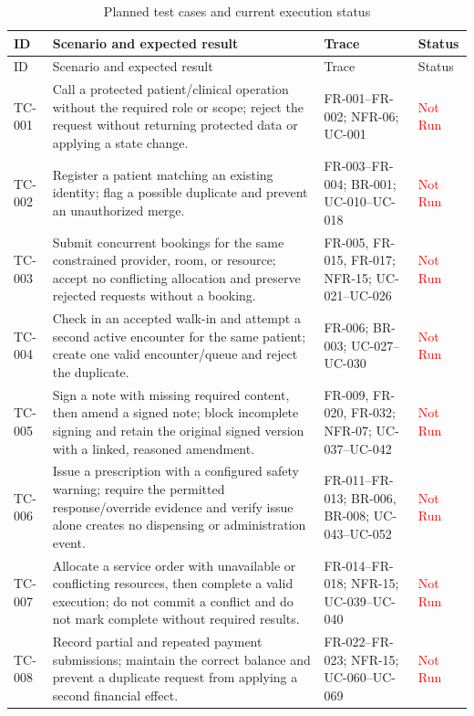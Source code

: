\documentclass[a4paper,12pt]{article}
\newcommand{\weak}[1]{\textcolor{red}{#1}}
\begin{document}
\begingroup
\scriptsize
\renewcommand{\arraystretch}{1.10}
\begin{longtable}{@{}p{}p{}p{}p{}@{}}
\caption{Planned test cases and current execution status}\label{tab:planned-test-cases}\\
\toprule ID & Scenario and expected result & Trace & Status \\
\midrule
\endfirsthead
\toprule ID & Scenario and expected result & Trace & Status \\
\midrule
\endhead
TC-001 & Call a protected patient/clinical operation without the required role or scope; reject the request without returning protected data or applying a state change. & FR-001--FR-002; NFR-06; UC-001 & \weak{Not Run} \\
TC-002 & Register a patient matching an existing identity; flag a possible duplicate and prevent an unauthorized merge. & FR-003--FR-004; BR-001; UC-010--UC-018 & \weak{Not Run} \\
TC-003 & Submit concurrent bookings for the same constrained provider, room, or resource; accept no conflicting allocation and preserve rejected requests without a booking. & FR-005, FR-015, FR-017; NFR-15; UC-021--UC-026 & \weak{Not Run} \\
TC-004 & Check in an accepted walk-in and attempt a second active encounter for the same patient; create one valid encounter/queue and reject the duplicate. & FR-006; BR-003; UC-027--UC-030 & \weak{Not Run} \\
TC-005 & Sign a note with missing required content, then amend a signed note; block incomplete signing and retain the original signed version with a linked, reasoned amendment. & FR-009, FR-020, FR-032; NFR-07; UC-037--UC-042 & \weak{Not Run} \\
TC-006 & Issue a prescription with a configured safety warning; require the permitted response/override evidence and verify issue alone creates no dispensing or administration event. & FR-011--FR-013; BR-006, BR-008; UC-043--UC-052 & \weak{Not Run} \\
TC-007 & Allocate a service order with unavailable or conflicting resources, then complete a valid execution; do not commit a conflict and do not mark complete without required results. & FR-014--FR-018; NFR-15; UC-039--UC-040 & \weak{Not Run} \\
TC-008 & Record partial and repeated payment submissions; maintain the correct balance and prevent a duplicate request from applying a second financial effect. & FR-022--FR-023; NFR-15; UC-060--UC-069 & \weak{Not Run} \\

\end{longtable}
\end{document}

